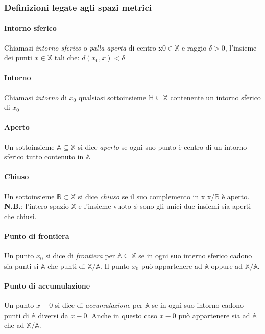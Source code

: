 	\subsubsection{Definizioni legate agli spazi metrici}
     
     \paragraph{Intorno sferico}
      Chiamasi \textit{intorno sferico} o \textit{palla aperta} di centro x0$\in \mathbb{X}$ e raggio $\delta >0$, l'insieme dei punti $x\in \mathbb{X}$ tali che: $d(x_0,x)<\delta$\\
      
      \paragraph{Intorno}
      Chiamasi \textit{intorno} di $x_0$ qualsiasi sottoinsieme $\mathbb{H} \subseteq \mathbb{X}$ contenente un intorno sferico di $x_0$
      
      \paragraph{Aperto}
      Un sottoinsieme $\mathbb{A}\subseteq \mathbb{X}$ si dice \textit{aperto} se ogni suo punto è centro di un intorno sferico tutto contenuto in $\mathbb{A}$
      
      \paragraph{Chiuso}
      Un sottoinsieme $\mathbb{B}\subset \mathbb{X}$ si dice \textit{chiuso} se il suo complemento in x x/$\mathbb{B}$ è aperto.
      \textbf{N.B.}: l'intero spazio $\mathbb{X}$ e l'insieme vuoto $\phi$ sono gli unici due insiemi sia aperti che chiusi.
     
     \paragraph{Punto di frontiera}
      Un punto $x_0$ si dice di \textit{frontiera} per $\mathbb{A} \subseteq \mathbb{X}$ se in ogni suo interno sferico cadono sia punti si $\mathbb{A}$ che punti di $\mathbb{X}/\mathbb{A}$. Il punto $x_0$ può appartenere ad $\mathbb{A}$ oppure ad $\mathbb{X}/\mathbb{A}$.
     
     \paragraph{Punto di accumulazione}
      Un punto $x-0$ si dice di \textit{accumulazione} per $\mathbb{A}$ se in ogni suo intorno cadono punti di $\mathbb{A}$ diversi da $x-0$. Anche in questo caso $x-0$ può appartenere sia ad $\mathbb{A}$ che ad $\mathbb{X}/\mathbb{A}$.
      
